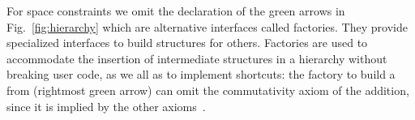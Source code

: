 \documentclass{easychair}
\begin{document}
For space constraints we omit the declaration
of the green arrows in Fig.~\ref{fig:hierarchy} which are alternative interfaces
called factories. They provide specialized interfaces to
build structures for others.
Factories are used to accommodate the insertion of
intermediate structures in a hierarchy without breaking user code, as we all
as to implement shortcuts: the factory to build a  from 
(rightmost green arrow)
can omit the commutativity axiom of the addition, since it is implied
by the other axioms~\cite{nearrings}.

\end{document}
